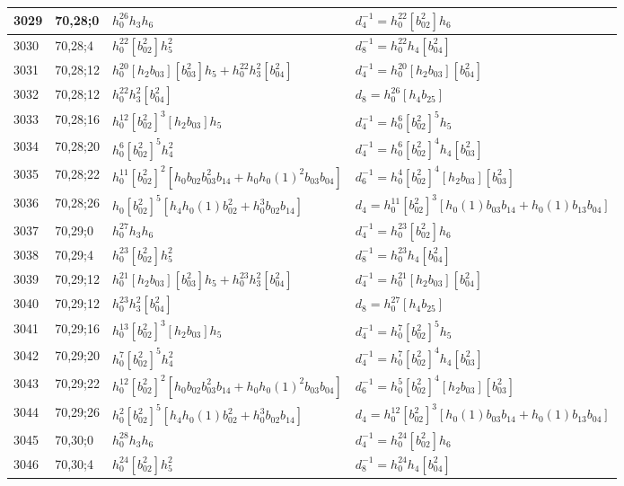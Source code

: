 \documentclass{article}
\begin{document}
\begin{longtable}{|l|l|>{\raggedright\arraybackslash}p{6cm}|>{\raggedright\arraybackslash}p{6cm}|}
\hline
3029 & 70,28;0 & $h_0^{26}h_3h_6$ & $d_{4}^{-1}=h_0^{22}[b_{02}^2]h_6$\\
\hline
3030 & 70,28;4 & $h_0^{22}[b_{02}^2]h_5^2$ & $d_{8}^{-1}=h_0^{22}h_4[b_{04}^2]$\\
\hline
3031 & 70,28;12 & $h_0^{20}[h_2b_{03}][b_{03}^2]h_5 + h_0^{22}h_3^2[b_{04}^2]$ & $d_{4}^{-1}=h_0^{20}[h_2b_{03}][b_{04}^2]$\\
3032 & 70,28;12 & $h_0^{22}h_3^2[b_{04}^2]$ &$d_{8}=h_0^{26}[h_4b_{25}]$\\
\hline
3033 & 70,28;16 & $h_0^{12}[b_{02}^2]^3[h_2b_{03}]h_5$ & $d_{4}^{-1}=h_0^6[b_{02}^2]^5h_5$\\
\hline
3034 & 70,28;20 & $h_0^6[b_{02}^2]^5h_4^2$ & $d_{4}^{-1}=h_0^6[b_{02}^2]^4h_4[b_{03}^2]$\\
\hline
3035 & 70,28;22 & $h_0^{11}[b_{02}^2]^2[h_0b_{02}b_{03}^2b_{14} + h_0h_0(1)^2b_{03}b_{04}]$ & $d_{6}^{-1}=h_0^4[b_{02}^2]^4[h_2b_{03}][b_{03}^2]$\\
\hline
3036 & 70,28;26 & $h_0[b_{02}^2]^5[h_4h_0(1)b_{02}^2 + h_0^3b_{02}b_{14}]$ &$d_{4}=h_0^{11}[b_{02}^2]^3[h_0(1)b_{03}b_{14} + h_0(1)b_{13}b_{04}]$\\
\hline
3037 & 70,29;0 & $h_0^{27}h_3h_6$ & $d_{4}^{-1}=h_0^{23}[b_{02}^2]h_6$\\
\hline
3038 & 70,29;4 & $h_0^{23}[b_{02}^2]h_5^2$ & $d_{8}^{-1}=h_0^{23}h_4[b_{04}^2]$\\
\hline
3039 & 70,29;12 & $h_0^{21}[h_2b_{03}][b_{03}^2]h_5 + h_0^{23}h_3^2[b_{04}^2]$ & $d_{4}^{-1}=h_0^{21}[h_2b_{03}][b_{04}^2]$\\
3040 & 70,29;12 & $h_0^{23}h_3^2[b_{04}^2]$ &$d_{8}=h_0^{27}[h_4b_{25}]$\\
\hline
3041 & 70,29;16 & $h_0^{13}[b_{02}^2]^3[h_2b_{03}]h_5$ & $d_{4}^{-1}=h_0^7[b_{02}^2]^5h_5$\\
\hline
3042 & 70,29;20 & $h_0^7[b_{02}^2]^5h_4^2$ & $d_{4}^{-1}=h_0^7[b_{02}^2]^4h_4[b_{03}^2]$\\
\hline
3043 & 70,29;22 & $h_0^{12}[b_{02}^2]^2[h_0b_{02}b_{03}^2b_{14} + h_0h_0(1)^2b_{03}b_{04}]$ & $d_{6}^{-1}=h_0^5[b_{02}^2]^4[h_2b_{03}][b_{03}^2]$\\
\hline
3044 & 70,29;26 & $h_0^2[b_{02}^2]^5[h_4h_0(1)b_{02}^2 + h_0^3b_{02}b_{14}]$ &$d_{4}=h_0^{12}[b_{02}^2]^3[h_0(1)b_{03}b_{14} + h_0(1)b_{13}b_{04}]$\\
\hline
3045 & 70,30;0 & $h_0^{28}h_3h_6$ & $d_{4}^{-1}=h_0^{24}[b_{02}^2]h_6$\\
\hline
3046 & 70,30;4 & $h_0^{24}[b_{02}^2]h_5^2$ & $d_{8}^{-1}=h_0^{24}h_4[b_{04}^2]$\\

\end{longtable}
\end{document}
